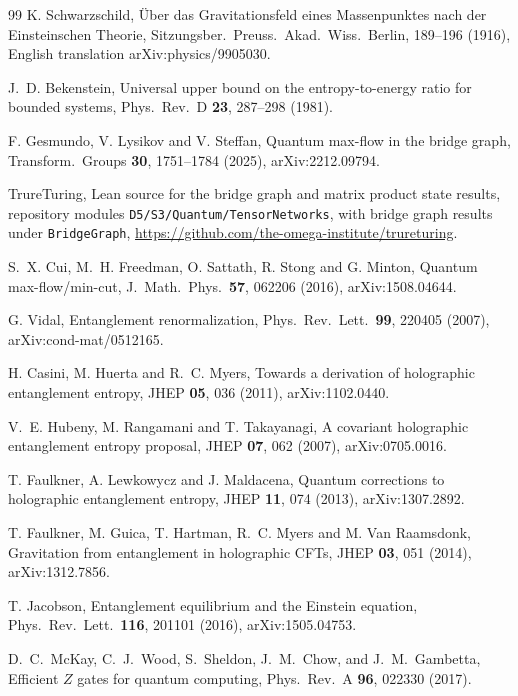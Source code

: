 \documentclass[aps,pra,onecolumn,superscriptaddress,nofootinbib,10pt]{revtex4-2}
\theoremstyle{definition}
\theoremstyle{remark}
\begin{document}
\begin{thebibliography}{99}
 K. Schwarzschild, \"Uber das Gravitationsfeld eines Massenpunktes nach der Einsteinschen Theorie, Sitzungsber.\ Preuss.\ Akad.\ Wiss.\ Berlin, 189--196 (1916), English translation arXiv:physics/9905030.

 J.~D. Bekenstein, Universal upper bound on the entropy-to-energy ratio for bounded systems, Phys.\ Rev.\ D \textbf{23}, 287--298 (1981).

 F. Gesmundo, V. Lysikov and V. Steffan, Quantum max-flow in the bridge graph, Transform.\ Groups \textbf{30}, 1751--1784 (2025), arXiv:2212.09794.

 TrureTuring, Lean source for the bridge graph and matrix product state results, repository modules \texttt{D5/S3/Quantum/TensorNetworks}, with bridge graph results under \texttt{BridgeGraph}, \url{https://github.com/the-omega-institute/trureturing}.

 S.~X. Cui, M.~H. Freedman, O. Sattath, R. Stong and G. Minton, Quantum max-flow/min-cut, J.\ Math.\ Phys.\ \textbf{57}, 062206 (2016), arXiv:1508.04644.

 G. Vidal, Entanglement renormalization, Phys.\ Rev.\ Lett.\ \textbf{99}, 220405 (2007), arXiv:cond-mat/0512165.

 H. Casini, M. Huerta and R.~C. Myers, Towards a derivation of holographic entanglement entropy, JHEP \textbf{05}, 036 (2011), arXiv:1102.0440.

 V.~E. Hubeny, M. Rangamani and T. Takayanagi, A covariant holographic entanglement entropy proposal, JHEP \textbf{07}, 062 (2007), arXiv:0705.0016.

 T. Faulkner, A. Lewkowycz and J. Maldacena, Quantum corrections to holographic entanglement entropy, JHEP \textbf{11}, 074 (2013), arXiv:1307.2892.

 T. Faulkner, M. Guica, T. Hartman, R.~C. Myers and M. Van Raamsdonk, Gravitation from entanglement in holographic CFTs, JHEP \textbf{03}, 051 (2014), arXiv:1312.7856.

 T. Jacobson, Entanglement equilibrium and the Einstein equation, Phys.\ Rev.\ Lett.\ \textbf{116}, 201101 (2016), arXiv:1505.04753.

 D.~C.~McKay, C.~J.~Wood, S.~Sheldon, J.~M.~Chow, and J.~M.~Gambetta, Efficient $Z$ gates for quantum computing, Phys.\ Rev.\ A \textbf{96}, 022330 (2017).


\end{thebibliography}
\end{document}
